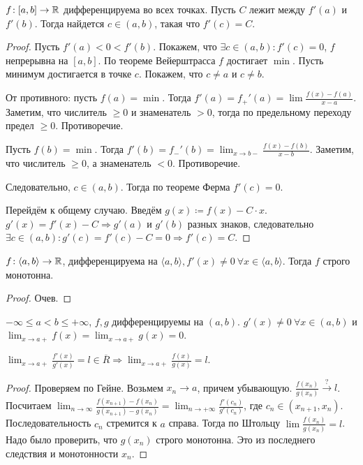 \begin{theorem}
    $f\!:[a, b] \to \mathbb{R}$ дифференцируема во всех точках. Пусть  $C$ лежит между  $f'(a)$ и  $f'(b)$. Тогда найдется  $c \in (a, b)$, такая что  $f'(c) = C$.
\end{theorem}
\begin{proof}
    Пусть $f'(a) < 0 < f'(b)$. Покажем, что $\exists c \in (a, b)\!: f'(c) = 0$, $f$ непрерывна на  $[a, b]$. По теореме Вейерштрасса  $f$ достигает  $\min$. Пусть минимум достигается в точке $c$. Покажем, что  $c \neq a$ и  $c \neq b$. 

    От противного: пусть $f(a) = \min$. Тогда  $f'(a) = f_+'(a) = \lim \frac{f(x)- f(a)}{x-a}$. Заметим, что числитель  $\ge 0$ и знаменатель $> 0$, тогда по предельному переходу предел  $\ge 0$. Противоречие.

    Пусть $f(b) = \min$. Тогда  $f'(b) = f_-'(b) = \lim_{x \to b-} \frac{f(x) - f(b)}{x - b}$. Заметим, что  числитель  $\ge 0$, а знаменатель $<0$. Противоречие.
    
    Следовательно,  $c \in (a, b)$. Тогда по теореме Ферма  $f'(c) = 0$. 

    Перейдём к общему случаю. Введём $g(x) \coloneqq f(x) - C \cdot x$.  $g'(x) = f'(x) - C \Rightarrow g'(a)$ и  $g'(b)$ разных знаков, следовательно  $\exists c \in (a, b)\!: g'(c) = f'(c) - C = 0 \Rightarrow f'(c) = C$.
\end{proof}
\begin{consequence}
    $f\!: \langle a, b \rangle \to \mathbb{R}$, дифференцируема на  $\langle a, b \rangle, f'(x) \neq 0\ \forall x \in \langle a, b \rangle $. Тогда  $f$ строго монотонна.
\end{consequence}
\begin{proof}
    Очев. 
\end{proof}
\begin{theorem}
	$-\infty \le a < b \le +\infty$, $f,g$ дифференцируемы на  $(a, b)$.  $g'(x) \neq 0\ \forall x \in (a, b)$ и $\lim_{x \to a+} f(x) = \lim_{x \to a+} g(x) = 0$. 

    $\lim_{x \to a+} \frac{f'(x)}{g'(x)} = l \in \overline{R} \Rightarrow \lim_{x \to a+} \frac{f(x)}{g(x)} = l$. 
\end{theorem}
\begin{proof}
    Проверяем по Гейне. Возьмем $x_n \to a$, причем убывающую.  $\frac{f(x_n)}{g(x_n)} \xrightarrow{?} l$. Посчитаем $\lim_{n \to \infty} \frac{f(x_{n+1}) - f(x_n)}{g(x_{n+1}) - g(x_n)} = \lim_{n \to +\infty} \frac{f'(c_n)}{g'(c_n)}$, где $c_n \in (x_{n+1}, x_n)$. Последовательность  $c_n$ стремится  к $a$ справа. Тогда по Штольцу $\lim \frac{f(x_n)}{g(x_n)} = l$. Надо было проверить, что $g(x_n)$ строго монотонна. Это из последнего следствия и монотонности $x_n$.
\end{proof}
